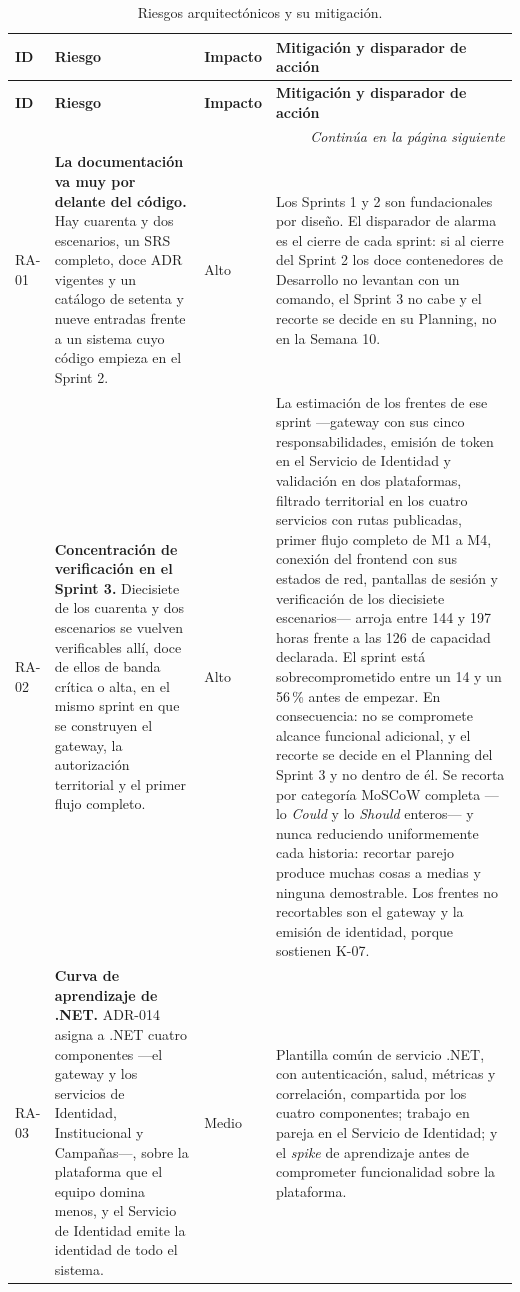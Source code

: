 \documentclass[11pt,a4paper]{article}
\newcommand{\contlinea}[1]{\multicolumn{#1}{r}{\footnotesize\itshape Continúa en la página siguiente}}
\begin{document}
\begin{longtable}{L{1.2cm} L{4.6cm} L{1.5cm} L{6.9cm}}
\caption{Riesgos arquitectónicos y su mitigación.}\label{tab:riesgos}\\
\toprule
\textbf{ID} & \textbf{Riesgo} & \textbf{Impacto} & \textbf{Mitigación y disparador de acción} \\
\midrule
\endfirsthead
\toprule
\textbf{ID} & \textbf{Riesgo} & \textbf{Impacto} & \textbf{Mitigación y disparador de acción} \\
\midrule
\endhead
\midrule
\contlinea{4} \\
\endfoot
\bottomrule
\endlastfoot
RA-01 & \textbf{La documentación va muy por delante del código.} Hay cuarenta y dos escenarios, un SRS completo, doce ADR vigentes y un catálogo de setenta y nueve entradas frente a un sistema cuyo código empieza en el Sprint 2. & Alto & Los Sprints 1 y 2 son fundacionales por diseño. El disparador de alarma es el cierre de cada sprint: si al cierre del Sprint 2 los doce contenedores de Desarrollo no levantan con un comando, el Sprint 3 no cabe y el recorte se decide en su Planning, no en la Semana 10. \\
RA-02 & \textbf{Concentración de verificación en el Sprint 3.} Diecisiete de los cuarenta y dos escenarios se vuelven verificables allí, doce de ellos de banda crítica o alta, en el mismo sprint en que se construyen el gateway, la autorización territorial y el primer flujo completo. & Alto & La estimación de los frentes de ese sprint ---gateway con sus cinco responsabilidades, emisión de token en el Servicio de Identidad y validación en dos plataformas, filtrado territorial en los cuatro servicios con rutas publicadas, primer flujo completo de M1 a M4, conexión del frontend con sus estados de red, pantallas de sesión y verificación de los diecisiete escenarios--- arroja entre 144 y 197 horas frente a las 126 de capacidad declarada. El sprint está sobrecomprometido entre un 14 y un 56\,\% antes de empezar. En consecuencia: no se compromete alcance funcional adicional, y el recorte se decide en el Planning del Sprint 3 y no dentro de él. Se recorta por categoría MoSCoW completa ---lo \emph{Could} y lo \emph{Should} enteros--- y nunca reduciendo uniformemente cada historia: recortar parejo produce muchas cosas a medias y ninguna demostrable. Los frentes no recortables son el gateway y la emisión de identidad, porque sostienen K-07. \\
RA-03 & \textbf{Curva de aprendizaje de .NET.} ADR-014 asigna a .NET cuatro componentes ---el gateway y los servicios de Identidad, Institucional y Campañas---, sobre la plataforma que el equipo domina menos, y el Servicio de Identidad emite la identidad de todo el sistema. & Medio & Plantilla común de servicio .NET, con autenticación, salud, métricas y correlación, compartida por los cuatro componentes; trabajo en pareja en el Servicio de Identidad; y el \emph{spike} de aprendizaje antes de comprometer funcionalidad sobre la plataforma. \\

\end{longtable}
\end{document}
